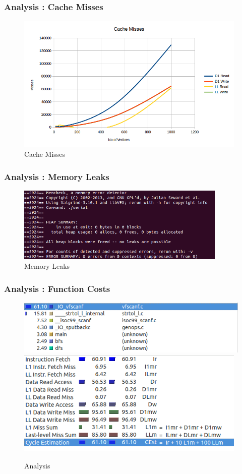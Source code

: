 \documentclass{beamer}
\begin{document}
\begin{frame}\frametitle{Analysis : Cache Misses}
\begin{figure}
\begin{center}
\includegraphics[width = 11cm]{cachemiss}
\caption{Cache Misses}
\end{center}
\end{figure}
\end{frame}

\begin{frame}
\frametitle{Analysis : Memory Leaks}
\begin{figure}
\begin{center}
\includegraphics[width = 10cm]{memcheck}
\caption{Memory Leaks}
\end{center}
\end{figure}
\end{frame}

\begin{frame}
\frametitle{Analysis : Function Costs}
\begin{figure}
\begin{center}
\includegraphics[width = 12cm]{kc1}\\
\includegraphics[width = 11cm]{kc2}

\caption{Analysis}
\end{center}
\end{figure}
\end{frame}
\end{document}
